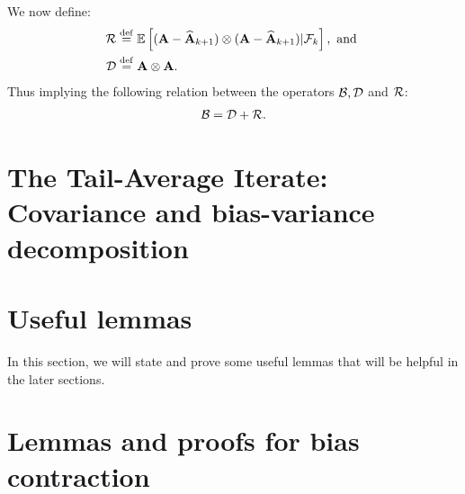 We now define:
\begin{align*}
\mathcal{R}&\stackrel{\mathrm{def}}{=}\mathbb{E}\left[(\mathbf{A}-\widehat{\mathbf{A}}_{k+1})\otimes(\mathbf{A}-\widehat{\mathbf{A}}_{k+1})|\mathcal{F}_k\right], \mbox{ and }\\
\mathcal{D}&\stackrel{\mathrm{def}}{=}\mathbf{A}\otimes\mathbf{A}.
\end{align*}
Thus implying the following relation between the operators $\mathcal{B},\mathcal{D}$ and $\mathcal{R}$:
\begin{align*}
\mathcal{B}=\mathcal{D}+\mathcal{R}.
\end{align*}


\section{The Tail-Average Iterate: Covariance and bias-variance decomposition}
\label{sec:tailAverageIterateCovariance}



\section{Useful lemmas}
\label{sec:commonLemmas}
In this section, we will state and prove some useful lemmas that will be helpful in the later sections.


\section{Lemmas and proofs for bias contraction}
\label{sec:biasContraction}



